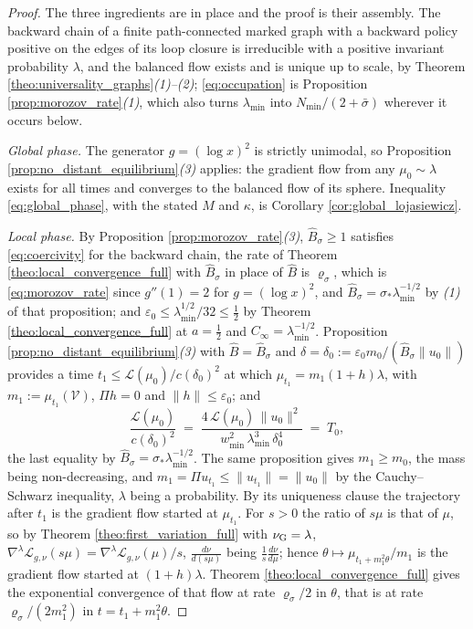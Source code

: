 \begin{proof}
The three ingredients are in place and the proof is their assembly. The backward chain of a finite path-connected marked graph with a backward policy positive on the edges of its loop closure is irreducible with a positive invariant probability $\lambda$, and the balanced flow exists and is unique up to scale, by Theorem \ref{theo:universality_graphs}\emph{(1)--(2)}; \eqref{eq:occupation} is Proposition \ref{prop:morozov_rate}\emph{(1)}, which also turns $\lambda_{\min}$ into $N_{\min}/(2+\bar\sigma)$ wherever it occurs below.

\emph{Global phase.} The generator $g=(\log x)^2$ is strictly unimodal, so Proposition \ref{prop:no_distant_equilibrium}\emph{(3)} applies: the gradient flow from any $\mu_0\sim\lambda$ exists for all times and converges to the balanced flow of its sphere. Inequality \eqref{eq:global_phase}, with the stated $M$ and $\kappa$, is Corollary \ref{cor:global_lojasiewicz}.

\emph{Local phase.} By Proposition \ref{prop:morozov_rate}\emph{(3)}, $\widehat B_\sigma\geq1$ satisfies \eqref{eq:coercivity} for the backward chain, the rate of Theorem \ref{theo:local_convergence_full} with $\widehat B_\sigma$ in place of $\widehat B$ is $\varrho_\sigma$, which is \eqref{eq:morozov_rate} since $g''(1)=2$ for $g=(\log x)^2$, and $\widehat B_\sigma=\sigma_*\lambda_{\min}^{-1/2}$ by \emph{(1)} of that proposition; and $\varepsilon_0\leq\lambda_{\min}^{1/2}/32\leq\frac12$ by Theorem \ref{theo:local_convergence_full} at $a=\frac12$ and $C_\infty=\lambda_{\min}^{-1/2}$. Proposition \ref{prop:no_distant_equilibrium}\emph{(3)} with $\widehat B=\widehat B_\sigma$ and $\delta=\delta_0:=\varepsilon_0m_0/(\widehat B_\sigma\|u_0\|)$ provides a time $t_1\leq\mathcal L(\mu_0)/c(\delta_0)^2$ at which $\mu_{t_1}=m_1(1+h)\lambda$, with $m_1:=\mu_{t_1}(\mathcal V)$, $\Pi h=0$ and $\|h\|\leq\varepsilon_0$; and
\begin{equation*}
    \frac{\mathcal L(\mu_0)}{c(\delta_0)^2}\;=\;\frac{4\,\mathcal L(\mu_0)\,\|u_0\|^2}{w_{\min}^2\,\lambda_{\min}^3\,\delta_0^4}\;=\;T_0,
\end{equation*}
the last equality by $\widehat B_\sigma=\sigma_*\lambda_{\min}^{-1/2}$. The same proposition gives $m_1\geq m_0$, the mass being non-decreasing, and $m_1=\Pi u_{t_1}\leq\|u_{t_1}\|=\|u_0\|$ by the Cauchy--Schwarz inequality, $\lambda$ being a probability. By its uniqueness clause the trajectory after $t_1$ is the gradient flow started at $\mu_{t_1}$. For $s>0$ the ratio of $s\mu$ is that of $\mu$, so by Theorem \ref{theo:first_variation_full} with $\nu_{\mathrm{G}}=\lambda$, $\nabla^\lambda\mathcal L_{g,\nu}(s\mu)=\nabla^\lambda\mathcal L_{g,\nu}(\mu)/s$, $\frac{d\nu}{d(s\mu)}$ being $\frac1s\frac{d\nu}{d\mu}$; hence $\theta\mapsto\mu_{t_1+m_1^2\theta}/m_1$ is the gradient flow started at $(1+h)\lambda$. Theorem \ref{theo:local_convergence_full} gives the exponential convergence of that flow at rate $\varrho_\sigma/2$ in $\theta$, that is at rate $\varrho_\sigma/(2m_1^2)$ in $t=t_1+m_1^2\theta$.


\end{proof}

